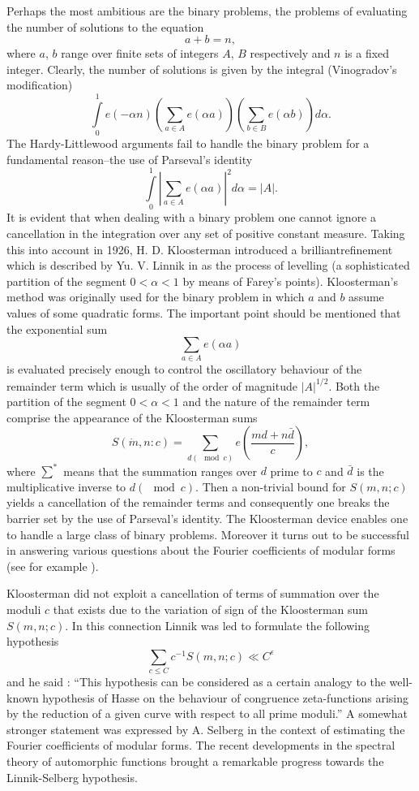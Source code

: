 Perhaps the most ambitious are the binary problems, \ie the problems of evaluating the number of solutions to the equation
$$
a + b = n,
$$
where $a$, $b$ range over finite sets of integers $A$, $B$ respectively and $n$ is a fixed integer. Clearly, the number of solutions is given by the integral (Vinogradov's modification)
$$
\int\limits^1_0 e (-\alpha n) \left(\sum\limits_{a\in A} e (\alpha a) \right) \left(\sum\limits_{b \in B} e(\alpha b) \right) d \alpha. 
$$
The Hardy-Littlewood arguments fail to handle the binary problem for a fundamental reason--the use of Parseval's identity
$$
\int\limits^1_0 |\sum\limits_{a\in A} e(\alpha a)|^2 d \alpha = |A|.
$$
It is evident that when dealing with a binary problem one cannot ignore a cancellation in the integration over any set of positive constant measure. Taking this into account in 1926, H. D. Kloosterman \cite{art6-key4} introduced a brilliant\pageoriginale refinement which is described by Yu. V. Linnik in \cite{art6-key6} as the process of levelling (a sophisticated partition of the segment $0 < \alpha < 1$ by means of Farey's points). Kloosterman's method was originally used for the binary problem in which $a$ and $b$ assume values of some quadratic forms. The important point should be mentioned that the exponential sum
$$
\sum\limits_{a \in A} e(\alpha a)
$$
is evaluated precisely enough to control the oscillatory behaviour of the remainder term which is usually of the order of magnitude $|A|^{1/2}$. Both the partition of the segment $0 < \alpha < 1$ and the nature of the remainder term comprise the appearance of the Kloosterman sums
$$
S (\dot{m}, n: c) = \sum\limits_{d (\mod c)} e\left(\frac{md + n\bar{d}}{c} \right),
$$
where $\sum^\ast$ means that the summation ranges over $d$ prime to $c$ and $\bar{d}$ is the multiplicative inverse to $d(\mod c)$. Then a non-trivial bound for $S(m, n;c)$ yields a cancellation of the remainder terms and consequently one breaks the barrier set by the use of Parseval's identity. The Kloosterman device enables one to handle a large class of binary problems. Moreover it turns out to be successful in answering various questions about the Fourier coefficients of modular forms (see for example \cite{art6-key5}).

Kloosterman did not exploit a cancellation of terms of summation over the moduli $c$ that exists due to the variation of sign of the Kloosterman sum $S(m, n;c)$. In this connection Linnik \cite{art6-key6} was led to formulate the following hypothesis
$$
\sum\limits_{c \leqslant C} c^{-1} S(m, n; c) \ll C^\epsilon
$$
and he said : ``This hypothesis can be considered as a certain analogy to the well-known hypothesis of Hasse on the behaviour of congruence zeta-functions arising by the reduction of a given curve with respect to all prime moduli.'' A somewhat stronger statement was expressed by A. Selberg \cite{art6-key8} in the context of estimating the Fourier coefficients of modular forms. The recent developments in the spectral theory of automorphic functions brought a remarkable progress towards the Linnik-Selberg hypothesis.

